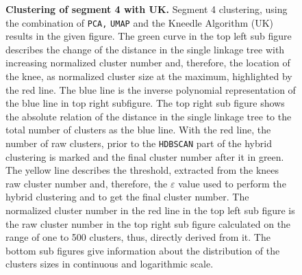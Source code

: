 \begin{figure}[!hbt]
\begin{subfigure}[b]{0.475\textwidth}
    \end{subfigure}
    \caption[Clustering of segment 4 with UK]{\textbf{Clustering of segment 4 with UK.} Segment 4 clustering, using the combination of \texttt{PCA,} \texttt{UMAP} and the Kneedle Algorithm (UK) results in the given figure. The green curve in the top left sub figure describes the change of the distance in the single linkage tree with increasing normalized cluster number and, therefore, the location of the knee, as normalized cluster size at the maximum, highlighted by the red line. The blue line is the inverse polynomial representation of the blue line in top right subfigure. The top right sub figure shows the absolute relation of the distance in the single linkage tree to the total number of clusters as the blue line. With the red line, the number of raw clusters, prior to the \texttt{HDBSCAN} part of the hybrid clustering is marked and the final cluster number after it in green. The yellow line describes the threshold, extracted from the knees raw cluster number and, therefore, the $\varepsilon$ value used to perform the hybrid clustering and to get the final cluster number. The normalized cluster number in the red line in the top left sub figure is the raw cluster number in the top right sub figure calculated on the range of one to 500 clusters, thus, directly derived from it. The bottom sub figures give information about the distribution of the clusters sizes in continuous and logarithmic scale.}
    \label{fig:UMAP_Cluster_Knee_4}
\end{figure}

\FloatBarrier
\newpage

